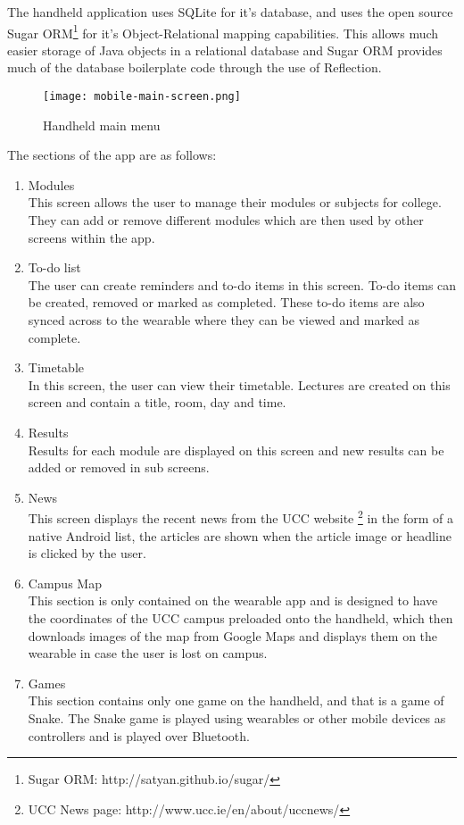 The handheld application uses SQLite for it's database, and uses the open source
Sugar ORM\footnote{Sugar ORM: http://satyan.github.io/sugar/} for it's
Object-Relational mapping capabilities. This allows much easier storage of Java
objects in a relational database and Sugar ORM provides much of the database
boilerplate code through the use of Reflection.

\begin{figure}
    \centering
    \texttt{[image: mobile-main-screen.png]}
    \caption{Handheld main menu}
    \label{fig:handheld_main_menu}
\end{figure}

The sections of the app are as follows:
\begin{enumerate}
\item Modules\\
    This screen allows the user to manage their modules or subjects for
    college. They can add or remove different modules which are then used by
    other screens within the app.
\item To-do list\\
    The user can create reminders and to-do items in this screen. To-do items
    can be created, removed or marked as completed. These to-do items are also
    synced across to the wearable where they can be viewed and marked as
    complete.
\item Timetable\\
    In this screen, the user can view their timetable. Lectures are created on
    this screen and contain a title, room, day and time.
\item Results\\
    Results for each module are displayed on this screen and new results can be
    added or removed in sub screens.
\item News\\
    This screen displays the recent news from the UCC website
    \footnote{UCC News page: http://www.ucc.ie/en/about/uccnews/} in the form
    of a native Android list, the articles are shown when the article image or
    headline is clicked by the user.
\item Campus Map\\
    This section is only contained on the wearable app and is designed to have
    the coordinates of the UCC campus preloaded onto the handheld, which then
    downloads images of the map from Google Maps and displays them on the
    wearable in case the user is lost on campus.
\item Games\\
    This section contains only one game on the handheld, and that is a game of
    Snake. The Snake game is played using wearables or other mobile devices as
    controllers and is played over Bluetooth.
\end{enumerate}

